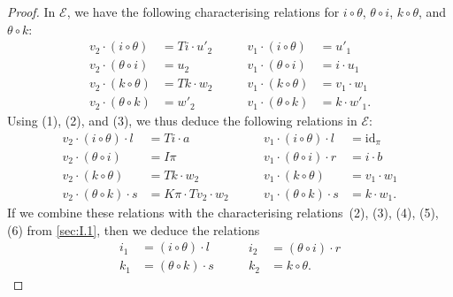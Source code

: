 \documentclass[fleqn]{article}
\newcommand{\id}{\mathrm{id}}
\newcommand{\cat}[1]{\mathcal{#1}}
\begin{document}
\begin{proof}
  In $\cat{E}$, we have the following characterising relations for $i\circ\theta$, $\theta\circ i$, $k\circ\theta$, and $\theta\circ k$:
  \[
    \begin{aligned}
      v_2\cdot(i\circ\theta)
      &= Ti\cdot u'_2
    \\v_2\cdot(\theta\circ i)
      &= u_2
    \\v_2\cdot(k\circ\theta)
      &= Tk\cdot w_2
    \\v_2\cdot(\theta\circ k)
      &= w'_2
    \end{aligned}
    \qquad
    \begin{aligned}
      v_1\cdot(i\circ\theta)
      &= u'_1
    \\v_1\cdot(\theta\circ i)
      &= i\cdot u_1
    \\v_1\cdot(k\circ\theta)
      &= v_1\cdot w_1
    \\v_1\cdot(\theta\circ k)
      &= k\cdot w'_1.
    \end{aligned}
    \tag{3}
  \]
  Using (1), (2), and (3), we thus deduce the following relations in $\cat{E}$:
  \[
    \begin{aligned}
      v_2\cdot(i\circ\theta)\cdot l
      &= Ti\cdot a
    \\v_2\cdot(\theta\circ i)
      &= I\pi
    \\v_2\cdot(k\circ\theta)
      &= Tk\cdot w_2
    \\v_2\cdot(\theta\circ k)\cdot s
      &= K\pi\cdot Tv_2\cdot w_2
    \end{aligned}
    \qquad
    \begin{aligned}
      v_1\cdot(i\circ\theta)\cdot l
      &= \id_\pi
    \\v_1\cdot(\theta\circ i)\cdot r
      &= i\cdot b
    \\v_1\cdot(k\circ\theta)
      &= v_1\cdot w_1
    \\v_1\cdot(\theta\circ k)\cdot s
      &= k\cdot w_1.
    \end{aligned}
  \]
  If we combine these relations with the characterising relations~(2), (3), (4), (5), (6) from \cref{sec:I.1}, then we deduce the relations
  \[
    \begin{aligned}
      i_1
      &= (i\circ\theta)\cdot l
    \\k_1
      &= (\theta\circ k)\cdot s
    \end{aligned}
    \qquad
    \begin{aligned}
      i_2
      &= (\theta\circ i)\cdot r
    \\k_2
      &= k\circ\theta.

\end{aligned}\]
\end{proof}
\end{document}
